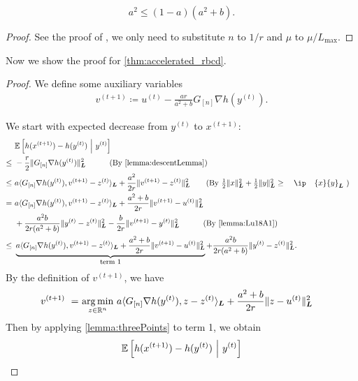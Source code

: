\begin{lemma} \label{lemma:Lu18A3}
    \[
        a^2 \leq (1 - a)(a^2 + b).
    \]
\end{lemma}
\begin{proof}
     See the proof of \citet[Lemma~A.3]{Lu18}, we only need to substitute $n$ to $1/r$ and $\mu$ to $\mu/L_{\max}$.
\end{proof}

Now we show the proof for \autoref{thm:accelerated_rbcd}. 
\begin{proof}
We define some auxiliary variables
\begin{align*}
    v^{(t+1)} \coloneqq u^{(t)} - \frac{ar}{a^2 + b} G_{[n]} \nabla h(y^{(t)}).
\end{align*}

We start with expected decrease from $y^{(t)}$ to $x^{(t+1)}$:
\begin{align*}
    & \mE \left[ h( x^{(t+1)} ) - h(y^{(t)}) ~\Big|~ y^{(t)}  \right] \\
    \leq~& -\frac{r}{2} \| G_{[n]} \nabla h( y^{(t)} ) \|_{\bL}^2  \qquad \text{(By \autoref{lemma:descentLemma})} \\
    \leq~& a \langle G_{[n]} \nabla h( y^{(t)} ), v^{(t+1)} - z^{(t)} \rangle_{\bL} + \frac{a^2}{2r} \| v^{(t+1)} - z^{(t)} \|_{\bL}^2 \quad \text{(By $\frac{1}{2}\|x\|^2_{\bL} + \frac{1}{2} \|y\|^2_{\bL} \geq \ip{x}{y}_{\bL}$ )}  \\
=~& a \langle G_{[n]} \nabla h( y^{(t)} ), v^{(t+1)} - z^{(t)} \rangle_{\bL} + \frac{a^2+b}{2r} \| v^{(t+1)} - u^{(t)} \|_{\bL}^2 \\&+ \frac{a^2b}{2r(a^2+b)} \| y^{(t)} - z^{(t)} \|_{\bL}^2 -  \frac{b}{2r} \| v^{(t+1)} - y^{(t)} \|_{\bL}^2 \qquad \text{(By \autoref{lemma:Lu18A1})} \\
\leq~& \underbrace{a \langle G_{[n]} \nabla h( y^{(t)} ), v^{(t+1)} - z^{(t)} \rangle_{\bL} + \frac{a^2+b}{2r} \| v^{(t+1)} - u^{(t)} \|_{\bL}^2}_{\mbox{\small term 1}} + \frac{a^2b}{2r(a^2+b)} \| y^{(t)} - z^{(t)} \|_{\bL}^2.
\end{align*}
By the definition of $v^{(t+1)}$, we have
\begin{align*}
    v^{(t+1)} ~=~ & \underset{z \in \mathbb{R}^n}{\arg\min} ~a \langle G_{[n]} \nabla h(y^{(t)}), z - z^{(t)} \rangle_{\boldsymbol{L}} + \frac{a^2+b}{2r} \| z - u^{(t)} \|_{\boldsymbol{L}}^2 
\end{align*}
Then by applying \autoref{lemma:threePoints} to term 1, we obtain
\begin{align}
    & \mE \left[ h( x^{(t+1)} ) - h(y^{(t)}) ~\Big|~ y^{(t)}  \right] \nonumber \\

\end{align}
\end{proof}
